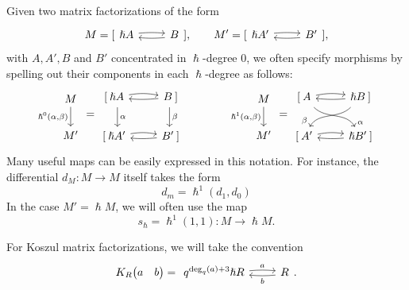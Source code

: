 \documentclass{article}
\newcommand{\mfshort}[4]{%
  \begin{tikzcd}[ampersand replacement=\&]
    {#1} \arrow[r, "#3", bend left=5,start anchor=east, end anchor=west, shift left=2pt]  \& 
    {#2} \arrow[l,"#4", bend left=5, start anchor=west, end anchor=east, shift left=2pt]
  \end{tikzcd}%
}
\newcommand{\kmf}[2]{
	K_{#1}{\begin{pmatrix}
			#2
		\end{pmatrix}
	}	
}
\theoremstyle{plain} %
\theoremstyle{definition} %
\theoremstyle{remark} %
\begin{document}
Given two matrix factorizations of the form
$$
M=[\mfshort{\hslash  A}{ B}{}{}]
,\qquad 
M'=[\mfshort{\hslash A'}{B'}{}{}]
,
$$
with $A,A',B$ and $B'$ concentrated in $\hslash$-degree 0, we often specify morphisms by spelling out their components in each $\hslash$-degree as follows:
\[
\begin{tikzcd}
    M 
    \arrow[d, "{\hslash^0(\alpha,\beta)}",swap] 
    \\ 
    M'
\end{tikzcd}
=
\begin{tikzcd}
    {} [ \: \hslash A \arrow[d, "\alpha", shift left=3pt]
    \arrow[r, out=5, in=175, bend left=10]  
    &  
     B\:]
    \arrow[d, "\beta", shift right=1pt] 
    \arrow[l, out=185, in=-5, swap]
    \\
   	{}  [\: \hslash A' 
   	\arrow[r, out=5, in=175, bend left=10]
   	& 
    B' \:]
    \arrow[l, out=185, in=-5, swap]
\end{tikzcd}
\qquad\qquad 
\begin{tikzcd}
    M 
    \arrow[d, "{\hslash^1(\alpha,\beta)}",swap] 
    \\ 
    M'
\end{tikzcd}
=
\begin{tikzcd}
    {}  [\:A \arrow[dr, "\alpha"{pos=1}, out=-45, in=120]\arrow[r, out=5, in=175, bend left=10]  &  \hslash B\:]\arrow[dl, "\beta"{pos=1}, out=-135, in=60,swap] \arrow[l, out=185, in=-5, swap]\\
     {} [\:A' \arrow[r, out=5, in=175, bend left=10]& 
     \hslash B' \arrow[l, out=185, in=-5, swap]\:]
\end{tikzcd}
\]
Many useful maps can be easily expressed in this notation. For instance, the differential $d_M:M\to M$ itself takes the form
$$
d_m=\hslash^1 (d_1,d_0)
$$
In the case $M'=\hslash M$, we will often use the map
$$
s_\hslash =\hslash^1(1,1):M\to \hslash M
.
$$

For Koszul matrix factorizations, we will take the convention
$$
	\kmf{R}{a & b }
	=
	\mfshort{q^{\deg_q(a)+3} \hslash  R}{R}{a}{b}
	.
$$
\end{document}
